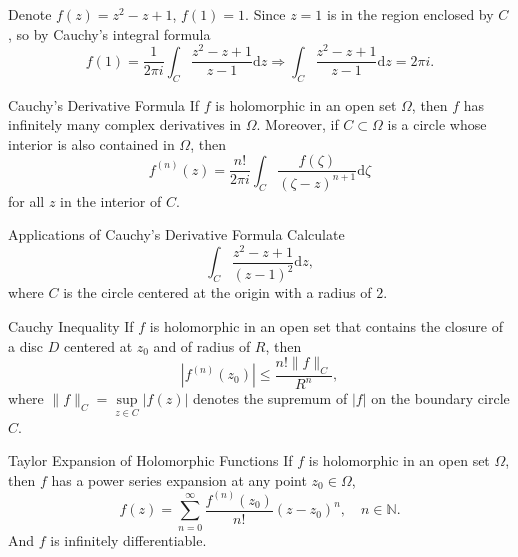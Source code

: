 \begin{solution}
  Denote $f(z) = z^2 - z + 1$, $f(1) = 1$.
  Since $z = 1$ is in the region enclosed by $C$, so by Cauchy's integral formula
  \begin{equation}
    f(1) = \frac{1}{2\pi i}\int_C \frac{z^2 - z + 1}{z - 1}\mathrm{d} z
    \Rightarrow \int_C \frac{z^2 - z + 1}{z - 1}\mathrm{d}z = 2 \pi i.
  \end{equation}
\end{solution}

\begin{corollary}{Cauchy's Derivative Formula}{}
  If $f$ is holomorphic in an open set $\Omega$,
  then $f$ has infinitely many complex derivatives in $\Omega$.
  Moreover, if $C \subset \Omega$ is a circle whose interior is also contained in $\Omega$,
  then
  \begin{equation}
    f^{(n)}(z) = \frac{n!}{2 \pi i} \int_C \frac{f(\zeta)}{(\zeta - z)^{n+1}}\mathrm{d} \zeta
  \end{equation}
  for all $z$ in the interior of $C$.
\end{corollary}

\begin{example}{Applications of Cauchy's Derivative Formula}{}
  Calculate
  \begin{equation}
    \int_C \frac{z^2 - z + 1}{(z-1)^2}\mathrm{d} z,
  \end{equation}
  where $C$ is the circle centered at the origin with a radius of $2$.
\end{example}

\begin{solution}
  
\end{solution}

\begin{corollary}{Cauchy Inequality}{}
  If $f$ is holomorphic in an open set that contains the closure of a disc $D$
  centered at $z_0$ and of radius of $R$, then
  \begin{equation}
    |f^{(n)}(z_0)| \leq \frac{n! \|f\|_C}{R^n},
  \end{equation}
  where $\|f\|_C = \sup \limits_{z \in C}|f(z)|$ denotes the supremum of $|f|$
  on the boundary circle $C$.
\end{corollary}

\begin{theorem}{Taylor Expansion of Holomorphic Functions}{}
  If $f$ is holomorphic in an open set $\Omega$,
  then $f$ has a power series expansion at any point $z_0 \in \Omega$,
  \begin{equation}
    f(z) = \sum\limits_{n = 0}^{\infty} \frac{f^{(n)}(z_0)}{n!}(z-z_0)^n, \quad n \in \mathbb{N}.
  \end{equation}
   And $f$ is infinitely differentiable.
\end{theorem}

